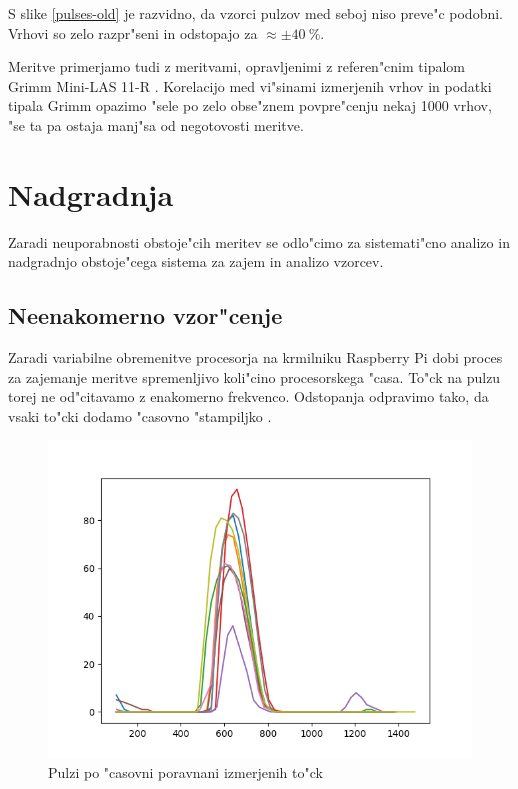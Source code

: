 \documentclass[11pt,a4paper]{article}
\begin{document}
S slike \ref{pulses-old} je razvidno, da vzorci pulzov med seboj niso preve"c podobni. Vrhovi so zelo razpr"seni in odstopajo za $ \approx \pm 40\ \% $.

Meritve primerjamo tudi z meritvami, opravljenimi z referen"cnim tipalom Grimm Mini-LAS 11-R \cite{grimm-min-las}. Korelacijo med vi"sinami izmerjenih vrhov in podatki tipala Grimm opazimo "sele po zelo obse"znem povpre"cenju nekaj 1000 vrhov, "se ta pa ostaja manj"sa od negotovosti meritve.

\clearpage

\section{Nadgradnja}
Zaradi neuporabnosti obstoje"cih meritev se odlo"cimo za sistemati"cno analizo in nadgradnjo obstoje"cega sistema za zajem in analizo vzorcev.

\subsection{Neenakomerno vzor"cenje}
Zaradi variabilne obremenitve procesorja na krmilniku Raspberry Pi dobi proces za zajemanje meritve spremenljivo koli"cino procesorskega "casa. To"ck na pulzu torej ne od"citavamo z enakomerno frekvenco. Odstopanja odpravimo tako, da vsaki to"cki dodamo "casovno "stampiljko .

\begin{figure}[H]
	\begin{center}
		\includegraphics[width=12cm]{aligned.png}
		\caption{Pulzi po "casovni poravnani izmerjenih to"ck}
		\label{aligned}
	\end{center}
\end{figure}
\end{document}
